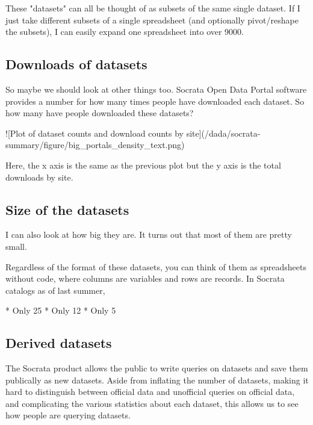 \documentclass{acm_proc_article-sp}
\begin{document}
These "datasets" can all be thought of as subsets of the same single dataset.
If I just take different subsets of a single spreadsheet (and optionally
pivot/reshape the subsets), I can easily expand one spreadsheet into over 9000.

\subsection{Downloads of datasets}
So maybe we should look at other things too.
Socrata Open Data Portal software provides a number for
how many times people have downloaded each dataset.
So how many have people downloaded these datasets?

![Plot of dataset counts and download counts by site](/dada/socrata-summary/figure/big_portals_density_text.png)

Here, the x axis is the same as the previous plot but the y axis is the total
downloads by site.

\subsection{Size of the datasets}
I can also look at how big they are.
It turns out that most of them are pretty small.


Regardless of the format of these datasets, you can think of them as
spreadsheets without code, where columns are variables and rows are records.
In Socrata catalogs as of last summer,

* Only 25%
* Only 12%
* Only 5%



\subsection{Derived datasets}
The Socrata product allows the public to write queries on datasets and
save them publically as new datasets. Aside from inflating the number
of datasets, making it hard to distinguish between official data and
unofficial queries on official data, and complicating the various
statistics about each dataset, this allows us to see how people are
querying datasets.
\end{document}
